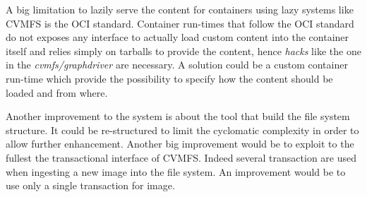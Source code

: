 A big limitation to lazily serve the content for containers using lazy systems
like CVMFS is the OCI standard. Container run-times that follow the OCI
standard do not exposes any interface to actually load custom content into the
container itself and relies simply on tarballs to provide the content, hence
\textit{hacks} like the one in the \textit{cvmfs/graphdriver} are necessary. A
solution could be a custom container run-time which provide the possibility to
specify how the content should be loaded and from where.

Another improvement to the system is about the tool that build the file system
structure. It could be re-structured to limit the cyclomatic complexity in
order to allow further enhancement. Another big improvement would be to exploit
to the fullest the transactional interface of CVMFS. Indeed several transaction
are used when ingesting a new image into the file system. An improvement would
be to use only a single transaction for image.

